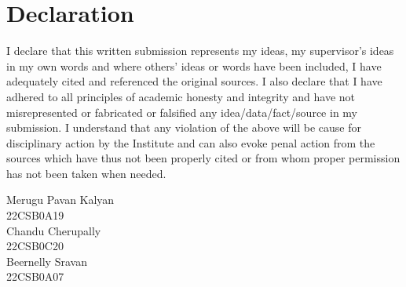 \chapter*{Declaration}

I declare that this written submission represents my ideas, my supervisor's ideas in my own words and where others'
ideas or words have been included, I have adequately cited and referenced the original sources.
I also declare that I have adhered to all principles of academic honesty and integrity and have
not misrepresented or fabricated or falsified any idea/data/fact/source in my submission. I
understand that any violation of the above will be cause for disciplinary action by the Institute
and can also evoke penal action from the sources which have thus not been properly cited or
from whom proper permission has not been taken when needed.
\vspace{10em}
\begin {flushleft}


Merugu Pavan Kalyan\\
22CSB0A19 \\[1 cm]
Chandu Cherupally\\
22CSB0C20 \\[1 cm]
Beernelly Sravan\\
22CSB0A07 \\[1 cm]


\date{\today}
\end{flushleft}
